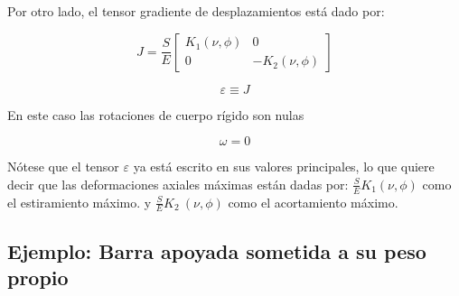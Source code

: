 \documentclass[../notas medios.tex]{subfiles}
\begin{document}
Por otro lado, el tensor gradiente de desplazamientos está dado por: 


\[J = \frac{S}{E}\left[ {\begin{array}{*{20}{c}}
{{K_1}\left( {\nu ,\phi } \right)}&0\\
0&{ - {K_2}\left( {\nu ,\phi } \right)}
\end{array}} \right]\]

\[\varepsilon  \equiv J\]

En este caso las rotaciones de cuerpo rígido son nulas

\[\omega  = 0\]

 Nótese que el tensor $\varepsilon $ ya está escrito en sus valores principales, lo que quiere decir que las deformaciones axiales máximas están dadas por: $\frac{S}{E}{K_1}\left( {\nu ,\phi }\right) $ como el estiramiento máximo. y $ \frac{S}{E} {K_2}\ \left({\nu ,\phi } \right)$  como el acortamiento máximo.

\subsection{Ejemplo: Barra apoyada sometida a su peso propio}
\end{document}

